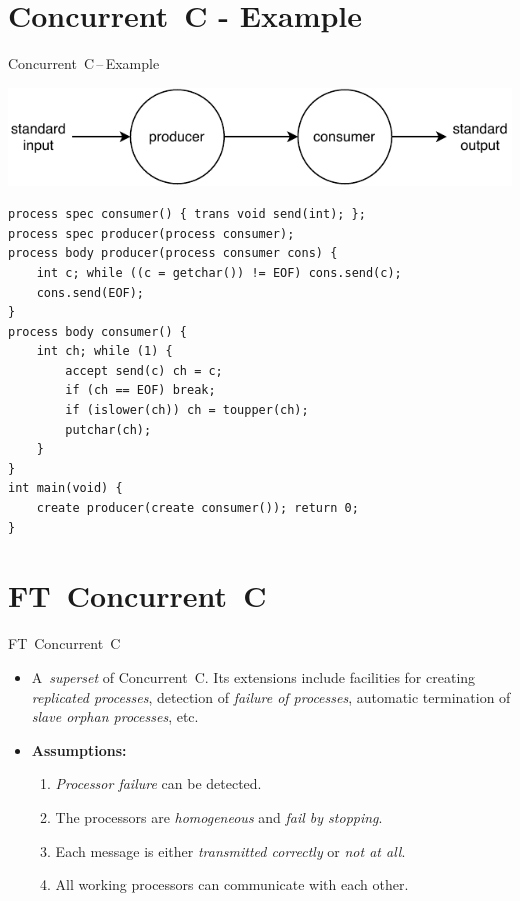 \documentclass[
    10pt, hyperref={unicode, colorlinks, hypertexnames=false,
    linkcolor=white}, aspectratio=169
]{beamer}
\begin{document}
\section{Concurrent~C - Example}
\begin{frame}[fragile]{Concurrent~C\,--\,Example}
    \centering

    \includegraphics[width=.4 \linewidth]{img/concurrent-c.pdf}

    \begin{lstlisting}
process spec consumer() { trans void send(int); };
process spec producer(process consumer);
process body producer(process consumer cons) {
    int c; while ((c = getchar()) != EOF) cons.send(c);
    cons.send(EOF);
}
process body consumer() {
    int ch; while (1) {
        accept send(c) ch = c;
        if (ch == EOF) break;
        if (islower(ch)) ch = toupper(ch);
        putchar(ch);
    }
}
int main(void) {
    create producer(create consumer()); return 0;
}
    \end{lstlisting}
\end{frame}


\section{FT~Concurrent~C}
\begin{frame}{FT~Concurrent~C}
    \begin{itemize}\setlength\itemsep{2.5em}
        \item
            A~\emph{superset} of \alert{Concurrent~C}. Its extensions include
            facilities for creating \emph{replicated processes}, detection
            of \emph{failure of processes}, automatic termination of
            \emph{slave orphan processes}, etc.

        \item
            \textbf{Assumptions:}

            \begin{enumerate}\setlength\itemsep{1em}
                \item
                    \emph{Processor failure} can be detected.

                \item
                    The processors are \emph{homogeneous} and \emph{fail
                    by stopping}.

                \item
                    Each message is either \emph{transmitted correctly} or
                    \emph{not at all}.

                \item
                    All working processors can communicate with each other.
            \end{enumerate}
    \end{itemize}
\end{frame}
\end{document}
